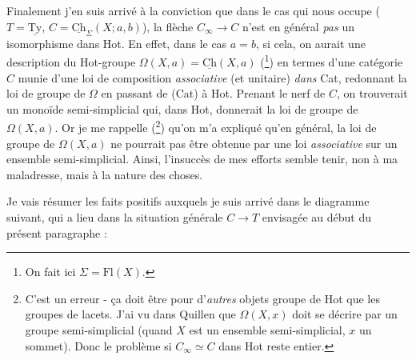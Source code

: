 \documentclass[11pt]{article}
\newcommand{\msp}[1]{\marginpar{\footnotesize [#1]}}
\newcommand{\Ch}{\underline{\mathrm{Ch}}}
\newcommand{\Ty}{\underline{\mathrm{Ty}}}
\begin{document}
Finalement j'en suis arrivé à la conviction que dans le cas qui nous occupe ($T = \Ty$, $C = \Ch_{\Sigma}(X;a,b)$), la flèche $C_{\infty} \longrightarrow C$ n'est en général \textit{pas} un isomorphisme dans Hot. En effet, dans le cas $a = b$, si cela,
\msp{page 113}
on aurait une description du Hot-groupe $\Omega(X,a) = \Ch(X,a)$ (\footnote[23]{On fait ici $\Sigma = \mathrm{Fl}(X)$.}) en termes d'une catégorie $C$ munie d'une loi de composition \textit{associative} (et unitaire) \textit{dans} Cat, redonnant la loi de groupe de $\Omega$ en passant de (Cat) à Hot. Prenant le nerf de $C$, on trouverait un monoïde semi-simplicial qui, dans Hot, donnerait la loi de groupe de $\Omega(X,a)$. Or je me rappelle (\footnote[24]{C'est un erreur - ça doit être pour d'\textit{autres} objets groupe de Hot que les groupes de lacets. J'ai vu dans Quillen que $\Omega(X,x)$ doit se décrire par un groupe semi-simplicial (quand $X$ est un ensemble semi-simplicial, $x$ un sommet). Donc le problème si $C_{\infty} \simeq C$ dans Hot reste entier.}) qu'on m'a expliqué qu'en général, la loi de groupe de $\Omega(X,a)$ ne pourrait pas être obtenue par une loi \textit{associative} sur un ensemble semi-simplicial. Ainsi, l'insuccès de mes efforts semble tenir, non à ma maladresse, mais à la nature des choses. %

Je vais résumer les faits positifs auxquels je suis arrivé dans le diagramme suivant, qui a lieu dans la situation générale $C \longrightarrow T$ envisagée au début du présent paragraphe :
\end{document}
